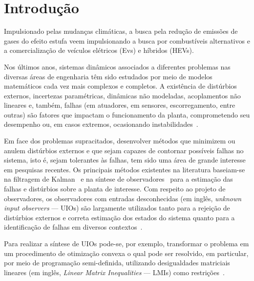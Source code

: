 \documentclass[11pt,a4paper]{article}
\begin{document}
 





\section{Introdução}

Impulsionado pelas mudanças climáticas, a busca pela redução de emissões de gases do 
efeito estufa veem impulsionando a busca por combustíveis alternativos e a 
comercialização de veículos elétricos (Evs) e híbridos (HEVs).

Nos últimos anos, sistemas dinâmicos associados a diferentes problemas
nas diversas áreas de engenharia têm sido estudados por meio de
modelos matemáticos cada vez mais complexos e completos. A existência
de distúrbios externos, incertezas paramétricas, dinâmicas não
modeladas, acoplamentos não lineares e, também, falhas (em atuadores, em
sensores, escorregamento, entre outras) são fatores que impactam o
funcionamento da planta, comprometendo seu desempenho ou, em casos
extremos, ocasionando instabilidades~\cite{XG:00,GC:14,LYCC:16}.


Em face dos problemas supracitados, desenvolver métodos que minimizem
ou anulem distúrbios externos e que sejam capazes de contornar
possíveis falhas no sistema, isto é, sejam tolerantes às falhas, tem
sido uma área de grande interesse em pesquisas recentes. Os principais
métodos existentes na literatura baseiam-se na filtragem de
Kalman~\cite{YCY:05,CH:16} e na síntese de 
observadores~\cite{LM:90,FF:12,WJ:13,ZDZ:16,CYGL:16} para a estimação
das falhas e distúrbios sobre a planta de interesse. Com respeito ao
projeto de observadores, os observadores com entradas desconhecidas
(em inglês, \emph{unknown input observers} --- UIOs) são largamente
utilizados tanto para a rejeição de distúrbios externos e correta
estimação dos estados do sistema quanto para a identificação de falhas
em diversos
contextos~\cite{TP:99a,Koe:05,Koe:06,LGBdS:11,IM:15,CYGL:16}.

Para realizar a síntese de UIOs pode-se, por exemplo, transformar o
problema em um procedimento de otimização convexa o qual pode ser
resolvido, em particular, por meio de programação semi-definida,
utilizando desigualdades matriciais lineares (em inglês, \emph{Linear
  Matrix Inequalities} --- LMIs) como
restrições~\cite{BEFB:94,EN:00,B-TEN:00}.
\end{document}

